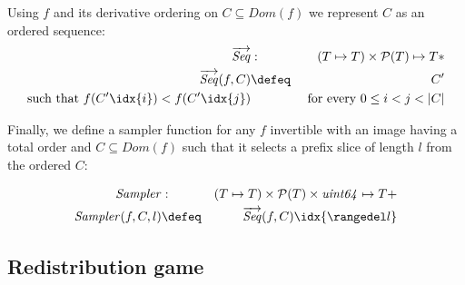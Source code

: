 \begin{definition}
\label{def:sampler}
%
Using $f$ and its derivative ordering on $C\subseteq\mathit{Dom}(f)$ we represent $C$ as an ordered sequence:
%
\begin{eqnarray}
\overrightarrow{\mathit{Seq}}
&:&(T\mapsto  T)\times\mathcal{P}(T)\mapsto T{*}\\
\overrightarrow{\mathit{Seq}}(f,C) 
&\defeq& C'\\
\text{such that }
f(C'\idx{i})<f(C'\idx{j}) &&\text{ for every } 0\leq i<j<\lvert C\rvert
\end{eqnarray}


Finally, we define a sampler function for any $f$ invertible with an image having a total order and $C\subseteq\mathit{Dom}(f)$ such that it selects a prefix slice of length $l$ from the ordered $C$:         

\begin{eqnarray}
\mathit{Sampler} &:&(T\mapsto  T)\times\mathcal{P}(T)\times \mathit{uint64}\mapsto T{+}\\
\mathit{Sampler}(f,C,l) &\defeq& \overrightarrow{\mathit{Seq}}(f,C)\idx{\rangedel l}
\end{eqnarray}
\end{definition}

\subsection{Redistribution game}\label{sec:appendix-game}
\label{sec:redistribution-game}

